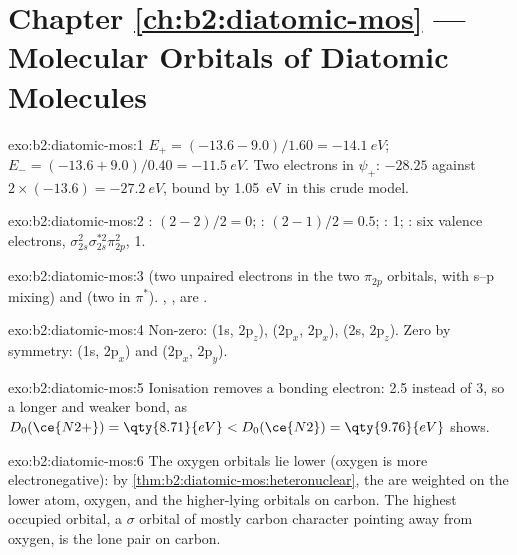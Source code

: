 \section*{Chapter \ref{ch:b2:diatomic-mos} --- Molecular Orbitals of Diatomic Molecules}

\begin{solution}{exo:b2:diatomic-mos:1}
$E_+ = (-13.6 - 9.0)/1.60 = \qty{-14.1}{eV}$; $E_- = (-13.6 + 9.0)/0.40 = \qty{-11.5}{eV}$.
Two electrons in $\psi_+$: $-28.25$ against $2 \times (-13.6) = \qty{-27.2}{eV}$, bound by
\qty{1.05}{eV} in this crude model.
\end{solution}

\begin{solution}{exo:b2:diatomic-mos:2}
: $(2 - 2)/2 = 0$; : $(2 - 1)/2 = 0.5$; : 1; : six valence
electrons, $\sigma_{2s}^2\sigma_{2s}^{*2}\pi_{2p}^2$,  1.
\end{solution}

\begin{solution}{exo:b2:diatomic-mos:3}
 (two unpaired electrons in the two $\pi_{2p}$ orbitals, with s--p mixing) and
 (two in $\pi^*$). , ,  are .
\end{solution}

\begin{solution}{exo:b2:diatomic-mos:4}
Non-zero: (1s, $2\mathrm p_z$), ($2\mathrm p_x$, $2\mathrm p_x$), (2s, $2\mathrm p_z$).
Zero by symmetry: (1s, $2\mathrm p_x$) and ($2\mathrm p_x$, $2\mathrm p_y$).
\end{solution}

\begin{solution}{exo:b2:diatomic-mos:5}
Ionisation removes a bonding electron:  2.5 instead of 3, so a longer and
weaker bond, as $D_0(\ce{N2+}) = \qty{8.71}{eV} < D_0(\ce{N2}) = \qty{9.76}{eV}$ shows.
\end{solution}

\begin{solution}{exo:b2:diatomic-mos:6}
The oxygen orbitals lie lower (oxygen is more electronegative): by
\cref{thm:b2:diatomic-mos:heteronuclear}, the  are weighted on the
lower atom, oxygen, and the higher-lying orbitals on carbon. The highest occupied
orbital, a $\sigma$ orbital of mostly carbon character pointing away from oxygen, is
the lone pair on carbon.
\end{solution}


